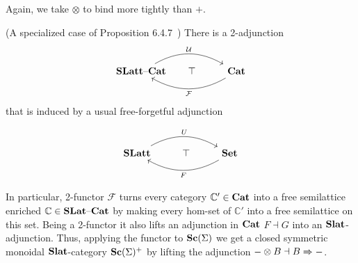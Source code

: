     Again, we take $\otimes$ to bind more tightly than $+$.
    
    \begin{proposition}(A specialized case of Proposition 6.4.7~\cite{Borceux_1994})
    There is a 2-adjunction 
    \[\begin{tikzcd}
        \catname{SLatt}\text{--}\catname{Cat}\arrow[rr, "\mathcal{U}", bend left] & \hspace{-1em}\top & \catname{Cat} \arrow[ll, "\mathcal{F}", bend left]
        \end{tikzcd}
    \]
    that is induced by a usual free-forgetful adjunction 
    
    \[\begin{tikzcd}
        \catname{SLatt} \arrow[rr, "U", bend left] & \top & \catname{Set} \arrow[ll, "F", bend left]
        \end{tikzcd}
    \]
    \end{proposition}
    
In particular, 2-functor $\mathcal{F}$ turns every category $\mathbb{C'} \in \mathbf{Cat}$ into a free semilattice enriched $\mathbb{C} \in \mathbf{SLat}\text{--}\mathbf{Cat}$ by making every hom-set of $\mathbb{C'}$ into a free semilattice on this set.
Being a 2-functor it also lifts an adjunction in $\mathbf{Cat}$ $F \dashv G$ into an $\mathbf{Slat}$-adjunction.
Thus, applying the functor to $\mathbf{Sc}(\Sigma)$ we get a closed symmetric monoidal $\mathbf{Slat}$-category $\mathbf{Sc}(\Sigma)^{+}$ by lifting the adjunction $- \otimes B \dashv B \xRightarrow{} -$.


